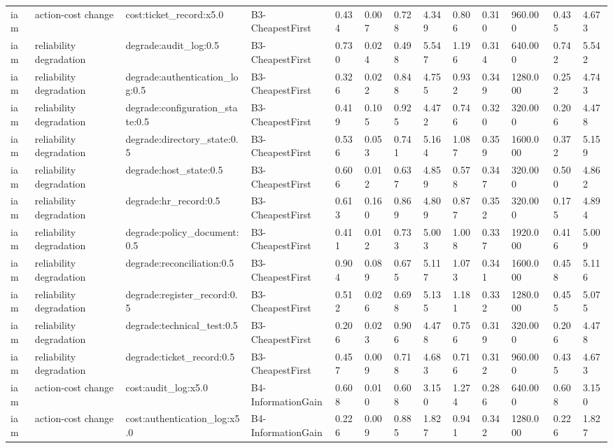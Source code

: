 \begin{table}[!ht]
{\begin{tabular}{lllllllllllll}
iam & action-cost change & cost:ticket\_record:x5.0 & B3-CheapestFirst & 0.434 & 0.007 & 0.728 & 4.349 & 0.806 & 0.310 & 960.000 & 0.435 & 4.673 \\
iam & reliability degradation & degrade:audit\_log:0.5 & B3-CheapestFirst & 0.730 & 0.024 & 0.498 & 5.547 & 1.196 & 0.314 & 640.000 & 0.742 & 5.542 \\
iam & reliability degradation & degrade:authentication\_log:0.5 & B3-CheapestFirst & 0.326 & 0.022 & 0.848 & 4.755 & 0.932 & 0.349 & 1280.000 & 0.252 & 4.743 \\
iam & reliability degradation & degrade:configuration\_state:0.5 & B3-CheapestFirst & 0.419 & 0.105 & 0.925 & 4.472 & 0.746 & 0.320 & 320.000 & 0.206 & 4.478 \\
iam & reliability degradation & degrade:directory\_state:0.5 & B3-CheapestFirst & 0.536 & 0.053 & 0.741 & 5.164 & 1.087 & 0.359 & 1600.000 & 0.372 & 5.159 \\
iam & reliability degradation & degrade:host\_state:0.5 & B3-CheapestFirst & 0.606 & 0.012 & 0.637 & 4.859 & 0.578 & 0.347 & 320.000 & 0.500 & 4.862 \\
iam & reliability degradation & degrade:hr\_record:0.5 & B3-CheapestFirst & 0.613 & 0.160 & 0.869 & 4.809 & 0.877 & 0.352 & 320.000 & 0.175 & 4.894 \\
iam & reliability degradation & degrade:policy\_document:0.5 & B3-CheapestFirst & 0.411 & 0.012 & 0.733 & 5.003 & 1.008 & 0.337 & 1920.000 & 0.416 & 5.009 \\
iam & reliability degradation & degrade:reconciliation:0.5 & B3-CheapestFirst & 0.904 & 0.089 & 0.675 & 5.117 & 1.073 & 0.341 & 1600.000 & 0.458 & 5.116 \\
iam & reliability degradation & degrade:register\_record:0.5 & B3-CheapestFirst & 0.512 & 0.026 & 0.698 & 5.135 & 1.181 & 0.332 & 1280.000 & 0.455 & 5.075 \\
iam & reliability degradation & degrade:technical\_test:0.5 & B3-CheapestFirst & 0.206 & 0.023 & 0.906 & 4.478 & 0.756 & 0.319 & 320.000 & 0.206 & 4.478 \\
iam & reliability degradation & degrade:ticket\_record:0.5 & B3-CheapestFirst & 0.457 & 0.009 & 0.718 & 4.683 & 0.716 & 0.312 & 960.000 & 0.435 & 4.673 \\
iam & action-cost change & cost:audit\_log:x5.0 & B4-InformationGain & 0.608 & 0.010 & 0.608 & 3.150 & 1.274 & 0.286 & 640.000 & 0.608 & 3.150 \\
iam & action-cost change & cost:authentication\_log:x5.0 & B4-InformationGain & 0.226 & 0.009 & 0.885 & 1.827 & 0.941 & 0.342 & 1280.000 & 0.226 & 1.827 \\

\end{tabular}}
\end{table}
